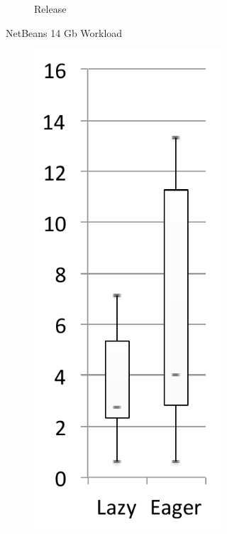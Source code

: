 \documentclass[sigplan,10pt,review,anonymous]{acmart}\settopmatter{printfolios=true,printccs=false,printacmref=false}
\begin{document}
\begin{figure}[bth]
\begin{subfigure}[b]{.48\textwidth}
\begin{subfigure}[b]{.24\textwidth}
		\caption{Release}
   	\end{subfigure}%
	\caption*{NetBeans 14 Gb Workload}
	\end{subfigure}%
	\begin{subfigure}[b]{.48\textwidth}
    	\begin{subfigure}[b]{.24\textwidth}
    		\includegraphics[width=\linewidth]{figures/wildflyLoad} 

\end{subfigure}
\end{subfigure}
\end{figure}
\end{document}
